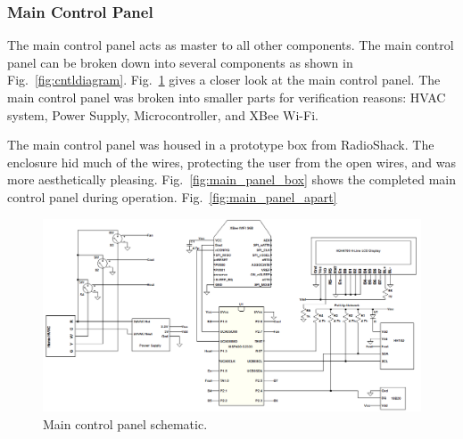 \subsubsection{Main Control Panel}
The main control panel acts as master to all other components. The main control panel can be broken down into several components as shown in Fig.~\ref{fig:cntldiagram}. Fig.~\ref{fig:main_cntl_schematic} gives a closer look at the main control panel.  The main control panel was broken into smaller parts for verification reasons: HVAC system, Power Supply, Microcontroller, and XBee Wi-Fi.

The main control panel was housed in a prototype box from RadioShack.  The enclosure hid much of the wires, protecting the user from the open wires, and was more aesthetically pleasing. Fig.~\ref{fig:main_panel_box} shows the completed main control panel during operation.  Fig.~\ref{fig:main_panel_apart}
\begin{figure}
\centering
\includegraphics[width=.99\textwidth]{main_cntl_schematic.png}
\caption{Main control panel schematic.}
\label{fig:main_cntl_schematic}
\end{figure}

